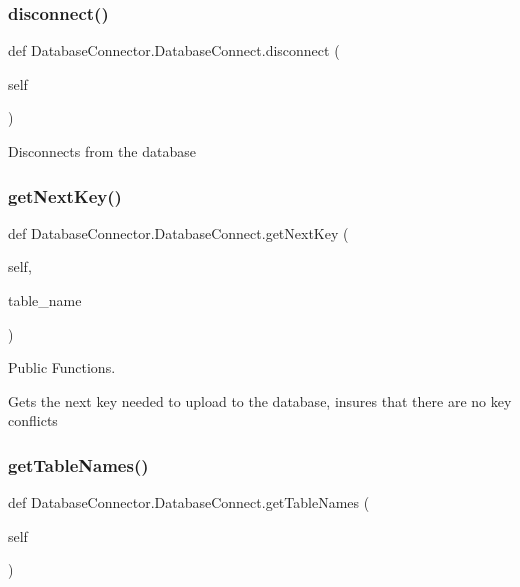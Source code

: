 \subsubsection{\texorpdfstring{disconnect()}{disconnect()}}
{\footnotesize\ttfamily def Database\+Connector.\+Database\+Connect.\+disconnect (\begin{DoxyParamCaption}\item[{}]{self }\end{DoxyParamCaption})}

\begin{DoxyVerb}Disconnects from the database\end{DoxyVerb}
 \mbox{\label{classDatabaseConnector_1_1DatabaseConnect_a2fea409b9f5b72e8c36f0dd0a8515253}} 
\subsubsection{\texorpdfstring{get\+Next\+Key()}{getNextKey()}}
{\footnotesize\ttfamily def Database\+Connector.\+Database\+Connect.\+get\+Next\+Key (\begin{DoxyParamCaption}\item[{}]{self,  }\item[{}]{table\+\_\+name }\end{DoxyParamCaption})}



Public Functions. 

\begin{DoxyVerb}Gets the next key needed to upload to the database, insures that there are no key conflicts\end{DoxyVerb}
 \mbox{\label{classDatabaseConnector_1_1DatabaseConnect_a2ea501b906d72bac48ea7bc92ae87044}} 
\subsubsection{\texorpdfstring{get\+Table\+Names()}{getTableNames()}}
{\footnotesize\ttfamily def Database\+Connector.\+Database\+Connect.\+get\+Table\+Names (\begin{DoxyParamCaption}\item[{}]{self }\end{DoxyParamCaption})}

